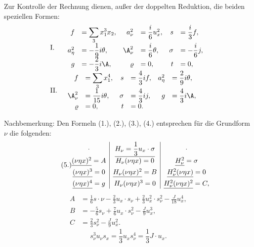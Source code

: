 Zur Kontrolle der Rechnung dienen, außer der \glqq{}doppelten Reduktion\grqq{}, die beiden speziellen Formen:
\[
\begin{array}{ll}
\text{I.}&\begin{array}{rlrlrl}
f&=\displaystyle\sum_3x_1^3x_2,& a_\nu^2&=\dfrac{i}{6}u_x^2,& s&=\dfrac{i}{3}f,\\
a_\eta^2&=-\dfrac19i\theta,& \A_\nu^2&=\dfrac{i}{6}\theta,& \sigma&=-\dfrac{i}{6}j,\\
g&=-\dfrac23i\A,& \varrho&=0,& t&=0,
\end{array}\\[1.2em]
\text{II.}&\begin{array}{rlrlrl}
f&=\displaystyle\sum_3x_1^4,& s&=\dfrac43if,& a_\eta^2&=\dfrac29i\theta,\\
\A_\nu^2&=\dfrac1{15}i\theta,& \sigma&=\dfrac43ij,& g&=\dfrac43i\A,\\
\varrho&=0,& t&=0.
\end{array}
\end{array}
\]

Nachbemerkung: Den Formeln (1.), (2.), (3.), (4.) entsprechen für die Grundform $\nu$ die folgenden:
\[
\tag{5.}
\begin{array}{@{}c|c|c@{}}
\cdot & \underline{H_\nu=\dfrac13u_x\cdot\sigma} & \cdot\\[0.45em]
\underline{(\nu\eta x)^2}=A & H_\nu(\nu\eta x)=0 & \underline{H_\nu^2}=\sigma\\[0.45em]
\underline{(\nu\eta x)^3}=0 & \underline{H_\nu(\nu\eta x)^2}=B & \underline{H_\nu^2(\nu\eta x)}=0\\[0.45em]
\underline{(\nu\eta x)^4}=g & H_\nu(\nu\eta x)^3=0 & \underline{H_\nu^2(\nu\eta x)^2}=C,
\end{array}
\]
\[
\begin{aligned}
A&=\frac16s\cdot\nu-\frac23u_x\cdot s_\nu+\frac23u_x^2\cdot s_\nu^2-\frac{J}{18}u_x^4,\\
B&=-\frac56s_\nu+\frac76u_x\cdot s_\nu^2-\frac{J}{9}u_x^3,\\
C&=\frac23s_\nu^2-\frac{J}{9}u_x^2.
\end{aligned}
\]
\[
\tag{6.}
s_\nu^3u_\nu s_x=\frac13u_xs_\nu^4=\frac13J\cdot u_x.
\]

